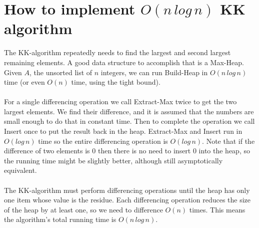 \documentclass[11pt]{article}
\begin{document}
\section{How to implement $O(n\,log\,n)$ KK algorithm}
The KK-algorithm repeatedly needs to find the largest and second largest remaining elements. A good data structure to accomplish that is a Max-Heap. Given $A$, the unsorted list of $n$ integers, we can run Build-Heap in $O(n\,log\,n)$ time (or even $O(n)$ time, using the tight bound). \\
\\
For a single differencing operation we call Extract-Max twice to get the two largest elements. We find their difference, and it is assumed that the numbers are small enough to do that in constant time. Then to complete the operation we call Insert once to put the result back in the heap. Extract-Max and Insert run in $O(log\,n)$ time so the entire differencing operation is $O(log\,n)$. Note that if the difference of two elements is 0 then there is no need to insert 0 into the heap, so the running time might be slightly better, although still asymptotically equivalent.\\
\\
The KK-algorithm must perform differencing operations until the heap has only one item whose value is the residue. Each differencing operation reduces the size of the heap by at least one, so we need to difference $O(n)$ times. This means the algorithm's total running time is $O(n\,log\,n)$.
\end{document}
